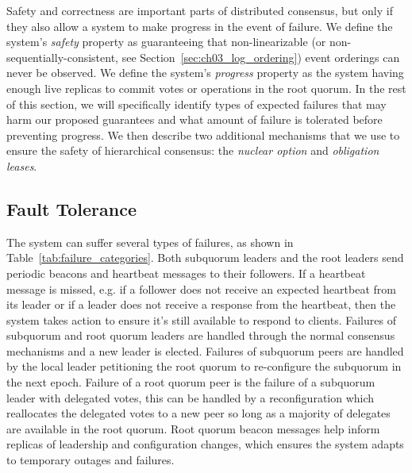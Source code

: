 Safety and correctness are important parts of distributed consensus, but only if they also allow a system to make progress in the event of failure.
We define the system's \emph{safety} property as guaranteeing that non-linearizable (or non-sequentially-consistent, see Section~\ref{sec:ch03_log_ordering}) event orderings can never be observed.
We define the system's \emph{progress} property as the system having enough live replicas to commit votes or operations in the root quorum.
In the rest of this section, we will specifically identify types of expected failures that may harm our proposed guarantees and what amount of failure is tolerated before preventing progress.
We then describe two additional mechanisms that we use to ensure the safety of hierarchical consensus: the \emph{nuclear option} and \emph{obligation leases}.

\subsection{Fault Tolerance}
\label{ch03_fault_tolerance}

The system can suffer several types of failures, as shown in Table~\ref{tab:failure_categories}.
Both subquorum leaders and the root leaders send periodic beacons and heartbeat messages to their followers.
If a heartbeat message is missed, e.g. if a follower does not receive an expected heartbeat from its leader or if a leader does not receive a response from the heartbeat, then the system takes action to ensure it's still available to respond to clients.
Failures of subquorum and root quorum leaders are handled through the normal consensus mechanisms and a new leader is elected.
Failures of subquorum peers are handled by the local leader petitioning the root quorum to re-configure the subquorum in the next epoch.
Failure of a root quorum peer is the failure of a subquorum leader with delegated votes, this can be handled by a reconfiguration which reallocates the delegated votes to a new peer so long as a majority of delegates are available in the root quorum.
Root quorum beacon messages help inform replicas of leadership and configuration changes, which ensures the system adapts to temporary outages and failures.

